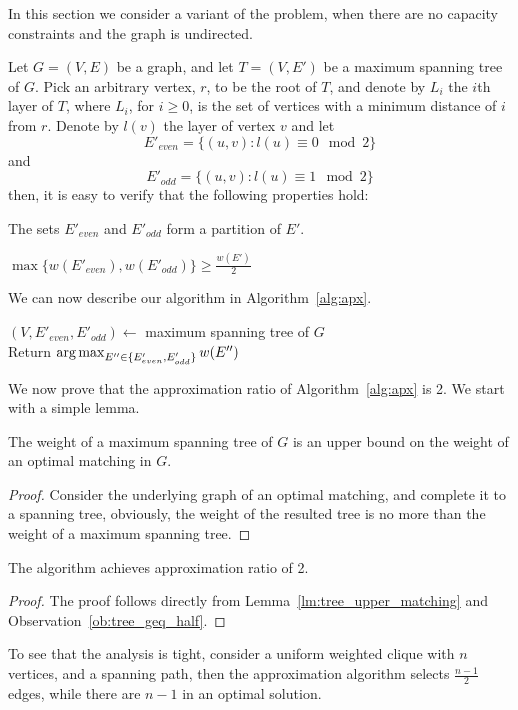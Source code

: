 \label{sub:ucudcm}
In this section we consider a variant of the problem, 
when there are no capacity constraints and the graph is undirected.

Let $G = (V, E)$ be a graph, 
and let $T = (V, E')$ be a maximum spanning tree of $G$.
Pick an arbitrary vertex, $r$, to be the root of $T$, 
and denote by $L_i$ the $i$th layer of $T$, 
where $L_i$, for $i \geq 0$, is the set of vertices with a minimum distance of $i$ from $r$.
Denote by $l(v)$ the layer of vertex $v$ and let 
$$ E'_{even} = \{ (u, v) : l(u) \equiv 0 \mod 2 \} $$
and    
$$ E'_{odd} = \{ (u, v) : l(u) \equiv 1 \mod 2 \} $$
then, it is easy to verify that the following properties hold:

\begin{observation}
The sets $E'_{even}$ and $E'_{odd}$ form a partition of $E'$. 
\end{observation}

\begin{observation}
\label{ob:tree_geq_half}
$ \max\{w(E'_{even}), w(E'_{odd})\}  \geq \frac{w(E')}{2} $
\end{observation}

We can now describe our algorithm in Algorithm~\ref{alg:apx}.

\begin{algorithm}
\label{alg:apx}
\caption{\UCUDCARPOOL{}}
$(V, E'_{even}, E'_{odd}) \leftarrow$ maximum spanning tree of $G$		\\
Return $\operatorname*{arg\,max}_{E'' \in \{ E'_{even}, E'_{odd} \}}{w(E'')} $	\\
\end{algorithm}

We now prove that the approximation ratio of Algorithm~\ref{alg:apx} is 2.
We start with a simple lemma.

\begin{lemma}
\label{lm:tree_upper_matching}
The weight of a maximum spanning tree of $G$ is an upper bound on the weight of
an optimal matching in $G$.
\end{lemma}

\begin{proof}
Consider the underlying graph of an optimal matching, and complete it to a spanning tree, obviously, the
weight of the resulted tree is no more than the weight of a maximum spanning
tree.
\end{proof}

\begin{theorem}
The \UCUDCARPOOL{} algorithm achi\-eves approximation ratio of 2.
\end{theorem}

\begin{proof}
The proof follows directly from 
Lemma~\ref{lm:tree_upper_matching} and Observation~\ref{ob:tree_geq_half}.
\end{proof}

To see that the analysis is tight, 
consider a uniform weighted clique with $n$ vertices, 
and a spanning path, 
then the approximation algorithm selects $\frac{n - 1}{2}$ edges, 
while there are $n - 1$ in an optimal solution.  